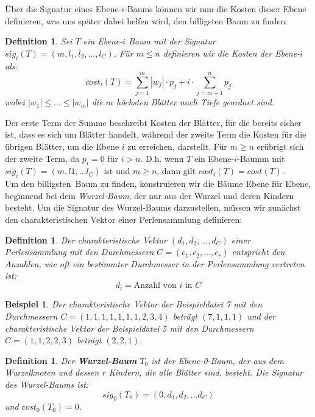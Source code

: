 \documentclass[a4paper,10pt,ngerman]{scrartcl}
\newtheorem{definition}[satz]{Definition}
\newtheorem{beispiel}[satz]{Beispiel}
\begin{document}
    Über die Signatur eines Ebene-$i$-Baums können wir nun die Kosten dieser Ebene definieren, was uns später dabei helfen wird, den \glqq billigsten\grqq{} Baum zu finden.
    \begin{definition}
        Sei $T$ ein Ebene-$i$ Baum mit der Signatur $sig_i(T) = (m, l_1, l_2, \dots, l_C)$. Für $m \le n$ definieren wir die Kosten der Ebene-$i$ als:
        \[cost_i(T) = \sum^m_{j=1} |w_j| \cdot p_j + i \cdot \sum^n_{j=m + 1}p_j\]
        wobei $|w_1| \le \dots \le |w_m|$ die $m$ höchsten Blätter nach Tiefe geordnet sind.
    \end{definition}
    Der erste Term der Summe beschreibt Kosten der Blätter, für die bereits sicher ist, dass es sich um Blätter handelt, während der zweite Term die Kosten für die übrigen Blätter, um die Ebene $i$ zu erreichen, darstellt.
    Für $m \ge n$ erübrigt sich der zweite Term, da $p_i = 0$ für $i > n$. D.h. wenn $T$ ein Ebene-$i$-Baumm mit $sig_i(T) = (m, l1, \dots l_C)$ ist und $m \ge n$, dann gilt $cost_i(T) = cost(T)$. \\
    Um den \glqq billigsten\grqq~Baum zu finden, konstruieren wir die Bäume Ebene für Ebene, beginnend bei dem \textit{Wurzel-Baum}, der nur aus der Wurzel und deren Kindern besteht.
    Um die Signatur des Wurzel-Baums darzustellen, müssen wir zunächst den charakteristischen Vektor einer Perlensammlung definieren:
    \begin{definition}
        Der charakteristische Vektor $(d_1, d_2, \dots, d_C)$ einer Perlensammlung mit den Durchmessern $C = (c_1, c_2, \dots, c_r)$ entspricht den Anzahlen, wie oft ein bestimmter Durchmesser in der Perlensammlung vertreten ist:
        \[d_i = \text{Anzahl von $i$ in $C$}\]
    \end{definition}
    \begin{beispiel}
        Der charakteristische Vektor der Beispieldatei 7 mit den Durchmessern $C = (1, 1, 1, 1, 1, 1, 1, 2, 3, 4)$ beträgt $(7, 1, 1, 1)$ und der charakteristische Vektor der Beispieldatei 5 mit den Durchmessern $C = (1, 1, 2, 2, 3)$ beträgt $(2, 2, 1)$.
    \end{beispiel}
    \begin{definition}
        Der \textbf{Wurzel-Baum} $T_0$ ist der Ebene-0-Baum, der aus dem Wurzelknoten und dessen $r$ Kindern, die alle Blätter sind, besteht.
        Die Signatur des Wurzel-Baums ist: \[sig_0(T_0) = (0, d_1, d_2, \dots d_C)\] und $cost_0(T_0) = 0$.
    \end{definition} %
\end{document}
